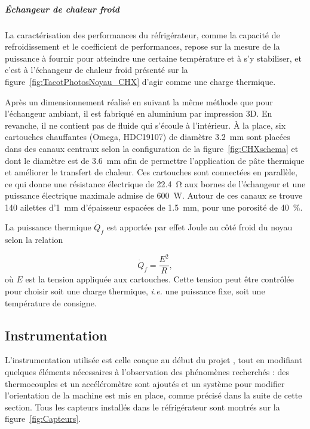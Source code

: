 \subparagraph{\'Echangeur de chaleur froid} \label{chap:DispExpe_CHX}
La caractérisation des performances du réfrigérateur, comme la capacité de refroidissement et le coefficient de performances, repose sur la mesure de la puissance à fournir pour atteindre une certaine température et à s'y stabiliser, et c'est à l'échangeur de chaleur froid présenté sur la figure~\ref{fig:TacotPhotosNoyau_CHX} d'agir comme une charge thermique.

Après un dimensionnement réalisé en suivant la même méthode que pour l'échangeur ambiant, il est fabriqué en aluminium par impression 3D. En revanche, il ne contient pas de fluide qui s'écoule à l'intérieur. À la place, six cartouches chauffantes (Omega, HDC19107) de diamètre \qty{3.2}{\milli\meter} sont placées dans des canaux centraux selon la configuration de la figure~\ref{fig:CHXschema} et dont le diamètre est de \qty{3.6}{\milli\meter} afin de permettre l'application de pâte thermique et améliorer le transfert de chaleur. Ces cartouches sont connectées en parallèle, ce qui donne une résistance électrique de \qty{22.4}{\ohm} aux bornes de l'échangeur et une puissance électrique maximale admise de \qty{600}{\watt}. Autour de ces canaux se trouve \num{140} ailettes d'\qty{1}{\milli\meter} d'épaisseur espacées de \qty{1.5}{\milli\meter}, pour une porosité de \qty{40}{\percent}.

La puissance thermique $\dot Q_f$ est apportée par effet Joule au côté froid du noyau selon la relation

\begin{equation}
	\dot Q_f = \frac{E^2}{R},
	\label{eq:Qf_Definition}
\end{equation}
où $E$ est la tension appliquée aux cartouches. Cette tension peut être contrôlée pour choisir soit une charge thermique, \textit{i.e.} une puissance fixe, soit une température de consigne.



\subsection{Instrumentation}
L'instrumentation utilisée est celle conçue au début du projet \cite{ramadan_design_2021}, tout en modifiant quelques éléments nécessaires à l'observation des phénomènes recherchés : des thermocouples et un accéléromètre sont ajoutés et un système pour modifier l'orientation de la machine est mis en place, comme précisé dans la suite de cette section. Tous les capteurs installés dans le réfrigérateur sont montrés sur la figure~\ref{fig:Capteurs}.

